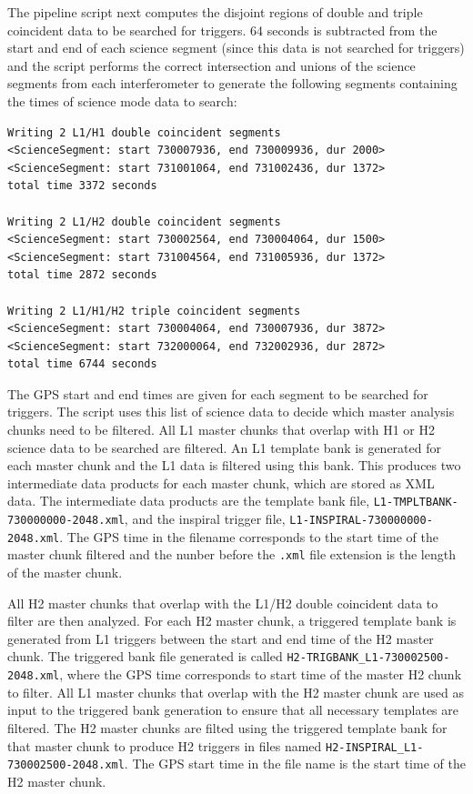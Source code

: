 The pipeline script next computes the disjoint regions of double and triple
coincident data to be searched for triggers. 64 seconds is subtracted from the
start and end of each science segment (since this data is not searched for
triggers) and the script performs the correct intersection and unions of the
science segments from each interferometer to generate the following segments
containing the times of science mode data to search:
\begin{verbatim}
Writing 2 L1/H1 double coincident segments 
<ScienceSegment: start 730007936, end 730009936, dur 2000>
<ScienceSegment: start 731001064, end 731002436, dur 1372>
total time 3372 seconds 

Writing 2 L1/H2 double coincident segments 
<ScienceSegment: start 730002564, end 730004064, dur 1500>
<ScienceSegment: start 731004564, end 731005936, dur 1372>
total time 2872 seconds 
 
Writing 2 L1/H1/H2 triple coincident segments 
<ScienceSegment: start 730004064, end 730007936, dur 3872>
<ScienceSegment: start 732000064, end 732002936, dur 2872>
total time 6744 seconds
\end{verbatim}
The GPS start and end times are given for each segment to be searched for
triggers.  The script uses this list of science data to decide which master
analysis chunks need to be filtered. All L1 master chunks that overlap with H1
or H2 science data to be searched are filtered. An L1 template bank is
generated for each master chunk and the L1 data is filtered using this bank.
This produces two intermediate data products for each master chunk, which are
stored as XML data. The intermediate data products are the template bank file,
\verb|L1-TMPLTBANK-730000000-2048.xml|, and the inspiral trigger file,
\verb|L1-INSPIRAL-730000000-2048.xml|. The GPS time in the filename
corresponds to the start time of the master chunk filtered and the nunber
before the \verb|.xml| file extension is the length of the master chunk.

All H2 master chunks that overlap with the L1/H2 double coincident data to
filter are then analyzed. For each H2 master chunk, a triggered template bank
is generated from L1 triggers between the start and end time of the H2 master
chunk. The triggered bank file generated is called
\verb|H2-TRIGBANK_L1-730002500-2048.xml|, where the GPS time corresponds to
start time of the master H2 chunk to filter. All L1 master chunks that overlap
with the H2 master chunk are used as input to the triggered bank generation to
ensure that all necessary templates are filtered.  The H2 master chunks are
filted using the triggered template bank for that master chunk to produce H2
triggers in files named \verb|H2-INSPIRAL_L1-730002500-2048.xml|. The GPS
start time in the file name is the start time of the H2 master chunk.

